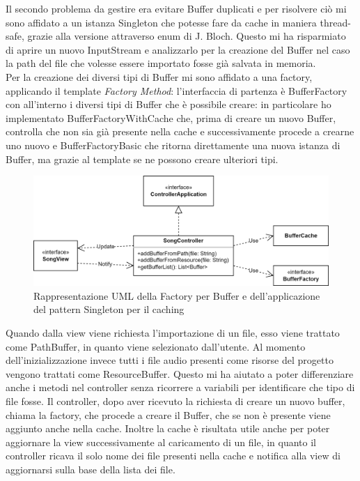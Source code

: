 \documentclass[a4paper,12pt]{report}
\begin{document}
Il secondo problema da gestire era evitare Buffer duplicati e per risolvere ciò mi sono affidato a un istanza Singleton che potesse fare da cache in maniera thread-safe, grazie alla versione attraverso enum di J. Bloch. Questo mi ha risparmiato di aprire un nuovo InputStream e analizzarlo per la creazione del Buffer nel caso la path del file che volesse essere importato fosse già salvata in memoria.
\\Per la creazione dei diversi tipi di Buffer mi sono affidato a una factory, applicando il template \textit{Factory Method}: l'interfaccia di partenza è BufferFactory con all'interno i diversi tipi di Buffer che è possibile creare: in particolare ho implementato BufferFactoryWithCache che, prima di creare un nuovo Buffer, controlla che non sia già presente nella cache e successivamente procede a crearne uno nuovo e BufferFactoryBasic che ritorna direttamente una nuova istanza di Buffer, ma grazie al template se ne possono creare ulteriori tipi.
%
\begin{figure}[H]
\centering{}
\includegraphics[width=\textwidth]{img/buffer/BufferMVC.png}
\caption{Rappresentazione UML della Factory per Buffer e dell’applicazione del pattern Singleton per il caching}
\label{img:buffermvc}
\end{figure}
Quando dalla view viene richiesta l’importazione di un file, esso viene trattato come PathBuffer, in quanto viene selezionato dall’utente. Al momento dell’inizializzazione invece tutti i file audio presenti come risorse del progetto vengono trattati come ResourceBuffer. Questo mi ha aiutato a poter differenziare anche i metodi nel controller senza ricorrere a variabili per identificare che tipo di file fosse. Il controller, dopo aver ricevuto la richiesta di creare un nuovo buffer, chiama la factory, che procede a creare il Buffer, che se non è presente viene aggiunto anche nella cache. Inoltre la cache è risultata utile anche per poter aggiornare la view successivamente al caricamento di un file, in quanto il controller ricava il solo nome dei file presenti nella cache e notifica alla view di aggiornarsi sulla base della lista dei file.
%
\end{document}
